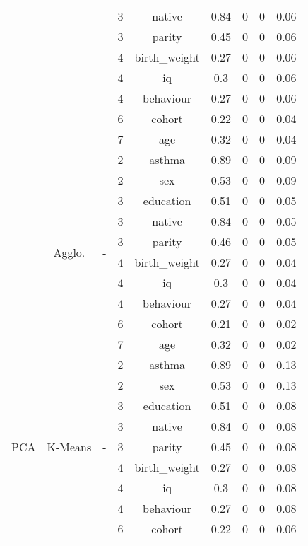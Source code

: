 \documentclass[CAT,BIB]{TFUOC}%
\begin{document}
\begin{table}
\begin{tabular}{@{}ccccccccc@{}}
            &  &  & 3 & native & 0.84 & 0 & 0 & 0.06 \\
            &  &  & 3 & parity & 0.45 & 0 & 0 & 0.06 \\
            &  &  & 4 & birth\_weight & 0.27 & 0 & 0 & 0.06 \\
            &  &  & 4 & iq & 0.3 & 0 & 0 & 0.06 \\
            &  &  & 4 & behaviour & 0.27 & 0 & 0 & 0.06 \\
            &  &  & 6 & cohort & 0.22 & 0 & 0 & 0.04 \\
            &  &  & 7 & age & 0.32 & 0 & 0 & 0.04 \\ \cmidrule(l){2-9}
            & \multirow{10}{*}{Agglo.} & \multirow{10}{*}{-} & 2 & asthma & 0.89 & 0 & 0 & 0.09 \\
            &  &  & 2 & sex & 0.53 & 0 & 0 & 0.09 \\
            &  &  & 3 & education & 0.51 & 0 & 0 & 0.05 \\
            &  &  & 3 & native & 0.84 & 0 & 0 & 0.05 \\
            &  &  & 3 & parity & 0.46 & 0 & 0 & 0.05 \\
            &  &  & 4 & birth\_weight & 0.27 & 0 & 0 & 0.04 \\
            &  &  & 4 & iq & 0.3 & 0 & 0 & 0.04 \\
            &  &  & 4 & behaviour & 0.27 & 0 & 0 & 0.04 \\
            &  &  & 6 & cohort & 0.21 & 0 & 0 & 0.02 \\
            &  &  & 7 & age & 0.32 & 0 & 0 & 0.02 \\ \midrule
            \multirow{30}{*}{PCA} & \multirow{10}{*}{K-Means} & \multirow{10}{*}{-} & 2 & asthma & 0.89 & 0 & 0 & 0.13 \\
            &  &  & 2 & sex & 0.53 & 0 & 0 & 0.13 \\
            &  &  & 3 & education & 0.51 & 0 & 0 & 0.08 \\
            &  &  & 3 & native & 0.84 & 0 & 0 & 0.08 \\
            &  &  & 3 & parity & 0.45 & 0 & 0 & 0.08 \\
            &  &  & 4 & birth\_weight & 0.27 & 0 & 0 & 0.08 \\
            &  &  & 4 & iq & 0.3 & 0 & 0 & 0.08 \\
            &  &  & 4 & behaviour & 0.27 & 0 & 0 & 0.08 \\
            &  &  & 6 & cohort & 0.22 & 0 & 0 & 0.06 \\

\end{tabular}
\end{table}
\end{document}
